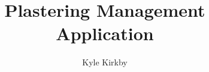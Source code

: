 \documentclass{report}
\begin{document}
\title{Plastering Management Application}
\author{Kyle Kirkby}

\maketitle
\tableofcontents






\end{document}
